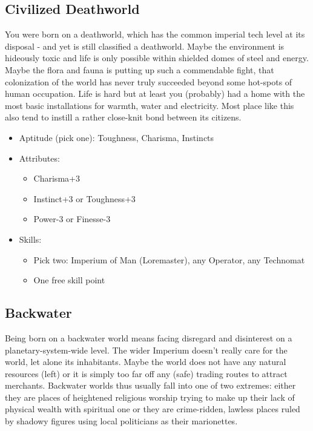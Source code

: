 \subsection{Civilized Deathworld}
You were born on a deathworld, which has the common imperial tech level at its disposal - and yet is still classified a deathworld. Maybe the environment is hideously toxic and life is only possible within shielded domes of steel and energy. Maybe the flora and fauna is putting up such a commendable fight, that colonization of the world has never truly succeeded beyond some hot-spots of human occupation. Life is hard but at least you (probably) had a home with the most basic installations for warmth, water and electricity. Most place like this also tend to instill a rather close-knit bond between its citizens. 

\begin{itemize}
	\item Aptitude (pick one): Toughness, Charisma, Instincts
	\item Attributes:
	\begin{itemize}
		\item Charisma+3
		\item Instinct+3 or Toughness+3
		\item Power-3 or Finesse-3
	\end{itemize}
	\item Skills: 
	\begin{itemize}
	 	\item Pick two: Imperium of Man (Loremaster), any Operator, any Technomat
	 	\item One free skill point
	 \end{itemize} 
\end{itemize}

\subsection{Backwater}
Being born on a backwater world means facing disregard and disinterest on a planetary-system-wide level. The wider Imperium doesn't really care for the world, let alone its inhabitants. Maybe the world does not have any natural resources (left) or it is simply too far off any (safe) trading routes to attract merchants. Backwater worlds thus usually fall into one of two extremes: either they are places of heightened religious worship trying to make up their lack of physical wealth with spiritual one or they are crime-ridden, lawless places ruled by shadowy figures using local politicians as their marionettes. 

